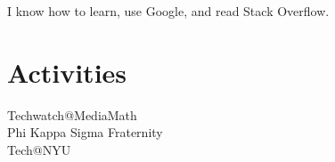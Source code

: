 \documentclass[]{hieudo-build}
\begin{document}
\begin{minipage}[t]{0.34\textwidth}
I know how to learn, use Google, and read Stack Overflow.

\sectionsep

\section{Activities}
Techwatch@MediaMath \\
Phi Kappa Sigma Fraternity \\
Tech@NYU \\
\sectionsep




\end{minipage} 
\hfill
\end{document}
